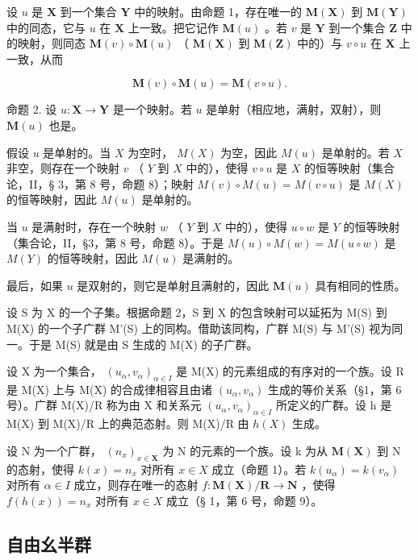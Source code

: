 设 \(u\) 是 \(\mathbf{X}\) 到一个集合 \(\mathbf{Y}\) 中的映射。由命题 1，存在唯一的 \(\mathbf{M}(\mathbf{X})\) 到 \(\mathbf{M}(\mathbf{Y})\) 中的同态，它与 \(u\) 在 \(\mathbf{X}\) 上一致。把它记作 \(\mathbf{M}(u)\) 。若 \(v\) 是 \(\mathbf{Y}\) 到一个集合 \(\mathbf{Z}\) 中的映射，则同态 \(\mathbf{M}(v) \circ \mathbf{M}(u)\) （ \(\mathbf{M}(\mathbf{X})\) 到 \(\mathbf{M}(\mathbf{Z})\) 中的）与 \(v \circ u\) 在 \(\mathbf{X}\) 上一致，从而

\[
\mathbf {M} (v) \circ \mathbf {M} (u) = \mathbf {M} (v \circ u).
\]

命题 2. 设 \(u: \mathbf{X} \to \mathbf{Y}\) 是一个映射。若 \(u\) 是单射（相应地，满射，双射），则 \(\mathbf{M}(u)\) 也是。

假设 \(u\) 是单射的。当 \(X\) 为空时， \(M(X)\) 为空，因此 \(M(u)\) 是单射的。若 \(X\) 非空，则存在一个映射 \(v\) （ \(Y\) 到 \(X\) 中的），使得 \(v \circ u\) 是 \(X\) 的恒等映射（集合论，II，§ 3，第 8 号，命题 8）；映射 \(M(v) \circ M(u) = M(v \circ u)\) 是 \(M(X)\) 的恒等映射，因此 \(M(u)\) 是单射的。

当 \(u\) 是满射时，存在一个映射 \(w\) （ \(Y\) 到 \(X\) 中的），使得 \(u \circ w\) 是 \(Y\) 的恒等映射（集合论，II，§3，第 8 号，命题 8）。于是 \(M(u) \circ M(w) = M(u \circ w)\) 是 \(M(Y)\) 的恒等映射，因此 \(M(u)\) 是满射的。

最后，如果 \(u\) 是双射的，则它是单射且满射的，因此 \(\mathbf{M}(u)\) 具有相同的性质。

设 S 为 X 的一个子集。根据命题 2，S 到 X 的包含映射可以延拓为 M(S) 到 M(X) 的一个子广群 M'(S) 上的同构。借助该同构，广群 M(S) 与 M'(S) 视为同一。于是 M(S) 就是由 S 生成的 M(X) 的子广群。

设 X 为一个集合， \((u_{\alpha}, v_{\alpha})_{\alpha \in I}\) 是 M(X) 的元素组成的有序对的一个族。设 R 是 M(X) 上与 M(X) 的合成律相容且由诸 \((u_{\alpha}, v_{\alpha})\) 生成的等价关系（§1，第 6 号）。广群 M(X)/R 称为由 X 和关系元 \((u_{\alpha}, v_{\alpha})_{\alpha \in I}\) 所定义的广群。设 h 是 M(X) 到 M(X)/R 上的典范态射。则 M(X)/R 由 \(h(X)\) 生成。

设 N 为一个广群， \((n_{x})_{x\in\mathbf{X}}\) 为 N 的元素的一个族。设 k 为从 \(\mathbf{M}(\mathbf{X})\) 到 N 的态射，使得 \(k(x)=n_{x}\) 对所有 \(x\in X\) 成立（命题 1）。若 \(k(u_{\alpha})=k(v_{\alpha})\) 对所有 \(\alpha\in I\) 成立，则存在唯一的态射 \(f\colon\mathbf{M}(\mathbf{X})/\mathbf{R}\to\mathbf{N}\) ，使得 \(f(h(x))=n_{x}\) 对所有 \(x\in X\) 成立（§ 1，第 6 号，命题 9）。

\subsection{自由幺半群}

